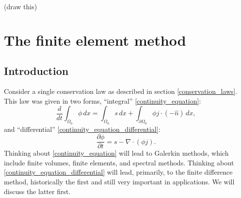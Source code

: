\documentclass[11pt,a4paper]{memoir}
\newcommand{\pomn}{{\partial\Omega_0}}
\newcommand{\Part}[2]{\frac{\partial #1}{\partial #2}}
\begin{document}
\vskip 0.2in
(draw this)
\vskip 0.2in




\chapter{The finite element method}
\section{Introduction}

Consider a single conservation law as described in section \ref{conservation_laws}. This law
was given in two forms, ``integral'' \eqref{continuity_equation}:
\begin{equation*}
    \frac{d}{dt} \int_{\Omega_0} \phi\,dx = \int_{\Omega_0} s\,dx + \int_{\pomn} \phi j \cdot \left(-\hat{n}\right)\,dx,
\end{equation*}
and ``differential'' \eqref{continuity_equation_differential}:
\begin{equation*}
    \Part{\phi}{t} = s - \nabla\cdot (\phi j).
\end{equation*}
Thinking about \eqref{continuity_equation} will lead to Galerkin methods, which include finite volumes, finite elements, and spectral methods.
Thinking about \eqref{continuity_equation_differential} will lead, primarily, to the finite difference method, historically the first and
still very important in applications. We will discuss the latter first.
\end{document}
